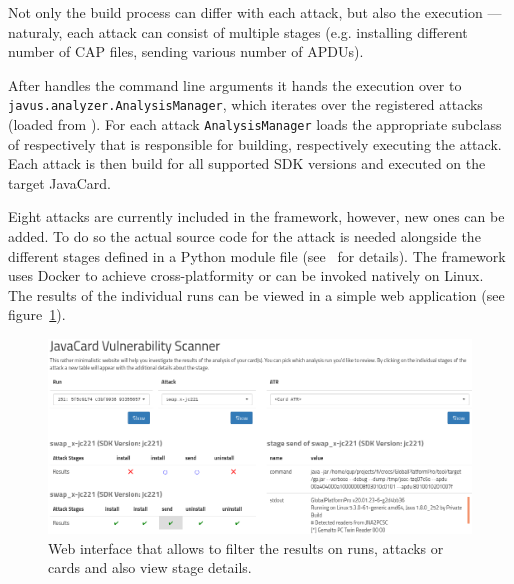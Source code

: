 \documentclass{../llncs/llncs}
\begin{document}
    Not only the build process can differ with each attack, but also the execution --- naturaly, each attack can consist of multiple stages (e.g. installing different number of CAP files, sending various number of APDUs).

    After \shortappclass handles the command line arguments it hands the execution over to \texttt{javus.analyzer.AnalysisManager}, which iterates over the registered attacks (loaded from ). For each attack \texttt{AnalysisManager} loads the appropriate subclass of \shortbuilderclass respectively \shortexecutorclass that is responsible for building, respectively executing the attack. Each attack is then build for all supported SDK versions and executed on the target JavaCard.

    Eight attacks are currently included in the framework, however, new ones can be added. To do so the actual source code for the attack is needed alongside the different stages defined in a Python module file (see~\cite{Kvapil2020thesis} for details). The framework uses Docker to achieve cross-platformity or can be invoked natively on Linux. The results of the individual runs can be viewed in a simple web application (see figure~\ref{fig:web-interface-pic}).

    \begin{figure}[htb]
        \centering
        \includegraphics[width=\textwidth]{src/imgs/overview-plus-detail.png}
        \caption{Web interface that allows to filter the results on runs, attacks or cards and also view stage details.\label{fig:web-interface-pic}}
    \end{figure}
\end{document}
